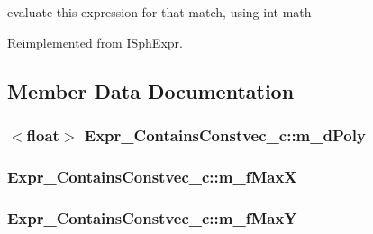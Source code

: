 evaluate this expression for that match, using int math 



Reimplemented from \hyperlink{structISphExpr_a32fb4380bed5d788ce29c0c659b2e917}{I\-Sph\-Expr}.



\subsection{Member Data Documentation}
\hypertarget{classExpr__ContainsConstvec__c_af3e896533ba6faf124b452a5c5d912b6}{
\subsubsection[{m\-\_\-d\-Poly}]{$<${\bf float}$>$ Expr\-\_\-\-Contains\-Constvec\-\_\-c\-::m\-\_\-d\-Poly\hspace{0.3cm}{\ttfamily [protected]}}}\label{classExpr__ContainsConstvec__c_af3e896533ba6faf124b452a5c5d912b6}
\hypertarget{classExpr__ContainsConstvec__c_a47d5320b393a49616d6a2c24448cd066}{
\subsubsection[{m\-\_\-f\-Max\-X}]{ Expr\-\_\-\-Contains\-Constvec\-\_\-c\-::m\-\_\-f\-Max\-X\hspace{0.3cm}{\ttfamily [protected]}}}\label{classExpr__ContainsConstvec__c_a47d5320b393a49616d6a2c24448cd066}
\hypertarget{classExpr__ContainsConstvec__c_a3efba92f44048cd5926603647ab2630b}{
\subsubsection[{m\-\_\-f\-Max\-Y}]{ Expr\-\_\-\-Contains\-Constvec\-\_\-c\-::m\-\_\-f\-Max\-Y\hspace{0.3cm}{\ttfamily [protected]}}}\label{classExpr__ContainsConstvec__c_a3efba92f44048cd5926603647ab2630b}
